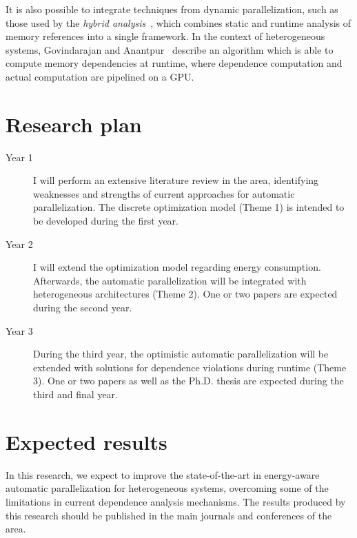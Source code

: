 \documentclass[a4paper,12pt]{article}
\newcommand\FIXME[1]{\textcolor{red}{FIX:}\textcolor{red}{#1}}
\begin{document}
It is also possible to integrate techniques from dynamic parallelization, such
as those used by the \emph{hybrid analysis}~\cite{rus03}, which combines static
and runtime analysis of memory references into a single framework.  In the
context of heterogeneous systems, Govindarajan and
Anantpur~\cite{govindarajan13} describe an algorithm which is able to compute
memory dependencies at runtime, where dependence computation and actual
computation are pipelined on a GPU.

\section{Research plan}

\begin{description}

\item[Year 1] I will perform an extensive literature review in the area,
identifying weaknesses and strengths of current approaches for automatic
parallelization.  The discrete optimization model (Theme 1) is intended to be
developed during the first year.

\item[Year 2] I will extend the optimization model regarding energy
consumption.  Afterwards, the automatic parallelization will be integrated with
heterogeneous architectures (Theme 2).  One or two papers are expected during
the second year.   

\item[Year 3] During the third year, the optimistic automatic parallelization
will be extended with solutions for dependence violations during runtime (Theme
3).  One or two papers as well as the Ph.D. thesis are expected during the
third and final year.

\end{description}

\section{Expected results}

In this research, we expect to improve the state-of-the-art in energy-aware
automatic parallelization for heterogeneous systems, overcoming some of the
limitations in current dependence analysis mechanisms.  The results produced by
this research should be published in the main journals and conferences of the
area.




\end{document}

